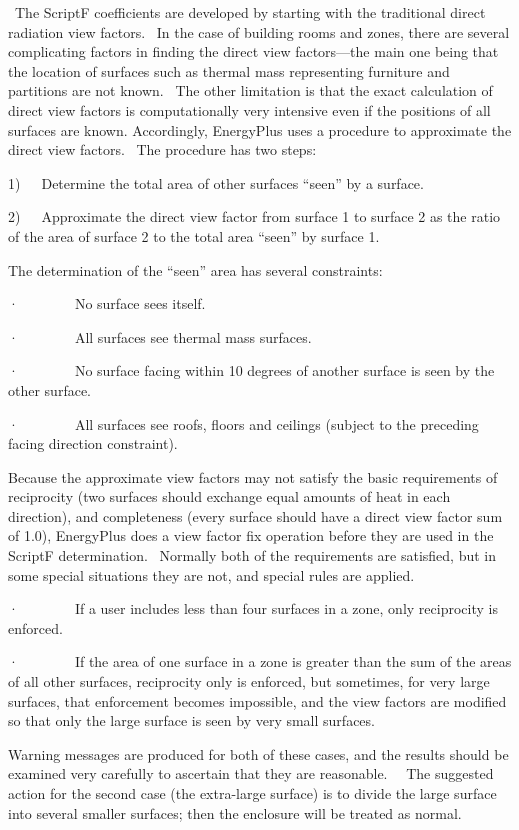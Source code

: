 ~The ScriptF coefficients are developed by starting with the traditional direct radiation view factors.~ In the case of building rooms and zones, there are several complicating factors in finding the direct view factors---the main one being that the location of surfaces such as thermal mass representing furniture and partitions are not known.~ The other limitation is that the exact calculation of direct view factors is computationally very intensive even if the positions of all surfaces are known. Accordingly, EnergyPlus uses a procedure to approximate the direct view factors.~ The procedure has two steps:

1)~~~Determine the total area of other surfaces ``seen'' by a surface.

2)~~~Approximate the direct view factor from surface 1 to surface 2 as the ratio of the area of surface 2 to the total area ``seen'' by surface 1.

The determination of the ``seen'' area has several constraints:

·~~~~~~~~No surface sees itself.

·~~~~~~~~All surfaces see thermal mass surfaces.

·~~~~~~~~No surface facing within 10 degrees of another surface is seen by the other surface.

·~~~~~~~~All surfaces see roofs, floors and ceilings (subject to the preceding facing direction constraint).

Because the approximate view factors may not satisfy the basic requirements of reciprocity (two surfaces should exchange equal amounts of heat in each direction), and completeness (every surface should have a direct view factor sum of 1.0), EnergyPlus does a view factor fix operation before they are used in the ScriptF determination.~ Normally both of the requirements are satisfied, but in some special situations they are not, and special rules are applied.

·~~~~~~~~If a user includes less than four surfaces in a zone, only reciprocity is enforced.

·~~~~~~~~If the area of one surface in a zone is greater than the sum of the areas of all other surfaces, reciprocity only is enforced, but sometimes, for very large surfaces, that enforcement becomes impossible, and the view factors are modified so that only the large surface is seen by very small surfaces.

Warning messages are produced for both of these cases, and the results should be examined very carefully to ascertain that they are reasonable.~~ The suggested action for the second case (the extra-large surface) is to divide the large surface into several smaller surfaces; then the enclosure will be treated as normal.

